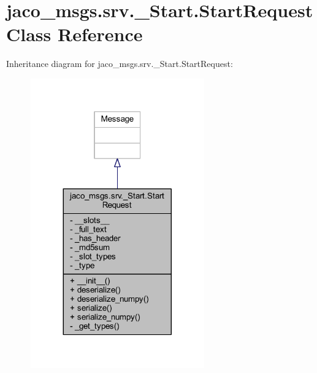 \hypertarget{classjaco__msgs_1_1srv_1_1__Start_1_1StartRequest}{}\section{jaco\+\_\+msgs.\+srv.\+\_\+\+Start.\+Start\+Request Class Reference}
\label{classjaco__msgs_1_1srv_1_1__Start_1_1StartRequest}


Inheritance diagram for jaco\+\_\+msgs.\+srv.\+\_\+\+Start.\+Start\+Request\+:
\nopagebreak
\begin{figure}[H]
\begin{center}
\leavevmode
\includegraphics[width=212pt]{d6/d87/classjaco__msgs_1_1srv_1_1__Start_1_1StartRequest__inherit__graph}
\end{center}
\end{figure}


